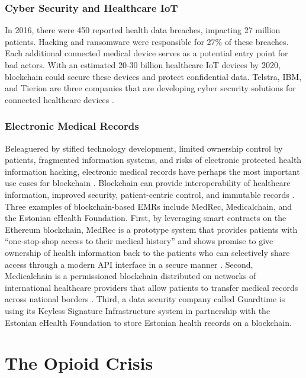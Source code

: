 \documentclass[sigconf]{acmart}
\begin{document}
\subsubsection{Cyber Security and Healthcare IoT}
In 2016, there were 450 reported health data breaches, impacting 27 million patients. Hacking and ransomware were responsible for 27\% of these breaches. Each additional connected medical device serves as a potential entry point for bad actors. With an estimated 20-30 billion healthcare IoT devices by 2020, blockchain could secure these devices and protect confidential data. Telstra, IBM, and Tierion are three companies that are developing cyber security solutions for connected healthcare devices \cite{das2017}.

\subsubsection{Electronic Medical Records} Beleaguered by stifled technology development, limited ownership control by patients, fragmented information systems, and risks of electronic protected health information hacking, electronic medical records have perhaps the most important use cases for blockchain \cite{yuan2016blockchains}. Blockchain can provide interoperability of healthcare information, improved security, patient-centric control, and immutable records \cite{das2017}. Three examples of blockchain-based EMRs include MedRec, Medicalchain, and the Estonian eHealth Foundation. First, by leveraging smart contracts on the Ethereum blockchain, MedRec is a prototype system that provides patients with ``one-stop-shop access to their medical history'' and shows promise to give ownership of health information back to the patients who can selectively share access through a modern API interface in a secure manner \cite{ekblaw2016medrec}. Second, Medicalchain is a permissioned blockchain distributed on networks of international healthcare providers that allow patients to transfer medical records across national borders \cite{hitchingHealthcare}. Third, a data security company called Guardtime is using its Keyless Signature Infrastructure system in partnership with the Estonian eHealth Foundation to store Estonian health records on a blockchain.

\section{The Opioid Crisis}
\end{document}
